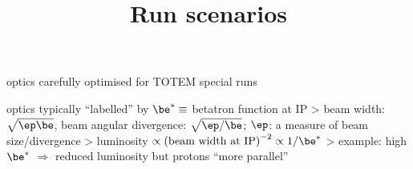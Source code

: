 \vskip2mm


\vfil
\> optics carefully optimised for TOTEM special runs

\vfil
\> optics typically ``labelled'' by $\be^* \equiv$ betatron function at IP
\>> beam width: $\sqrt{\ep \be}$, beam angular divergence: $\sqrt{\ep / \be}$; $\ep$: a measure of beam size/divergence
\>> luminosity $\propto \hbox{(beam width at IP)}^{-2} \propto 1/\be^*$
\>> example: \cYe high $\be^*$ $\Rightarrow$ reduced luminosity but protons ``more parallel''\cFg


\newpage %
\title{Run scenarios}

